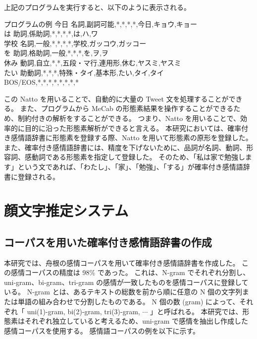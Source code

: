 \documentclass[11pt,a4j]{jsarticle}
\begin{document}
上記のプログラムを実行すると、以下のように表示される。

\begin{itembox}[l]{プログラムの例}
  今日  名詞,副詞可能,*,*,*,*,今日,キョウ,キョー \\
  は  助詞,係助詞,*,*,*,*,は,ハ,ワ\\ 
  学校  名詞,一般,*,*,*,*,学校,ガッコウ,ガッコー\\
  を  助詞,格助詞,一般,*,*,*,を,ヲ,ヲ\\
  休み  動詞,自立,*,*,五段・マ行,連用形,休む,ヤスミ,ヤスミ\\
  たい  助動詞,*,*,*,特殊・タイ,基本形,たい,タイ,タイ\\
 BOS/EOS,*,*,*,*,*,*,*,*\\
\end{itembox}

この Natto を用いることで、自動的に大量の Tweet 文を処理することができる。
また、プログラムから MeCab の形態素結果を操作することができるため、制約付きの解析をすることができる。
つまり、Natto を用いることで、効率的に目的に沿った形態素解析ができると言える。
本研究においては、確率付き感情語辞書に形態素を登録する際、Natto を用いて形態素の原形を登録した。
また、確率付き感情語辞書には、精度を下げないために、品詞が名詞、動詞、形容詞、感動詞である形態素を指定して登録した。
そのため、「私は家で勉強します」という文であれば、「わたし」、「家」、「勉強」、「する」が確率付き感情語辞書に登録される。


\section{顔文字推定システム}\label{sec:theorem}
  \subsection{コーパスを用いた確率付き感情語辞書の作成}\label{sec:tweetcorpus}
本研究では、舟根の感情コーパスを用いて確率付き感情語辞書を作成した。
この感情コーパスの精度は 98\% であった。
これは、N-gram でそれぞれ分割し、uni-gram、bi-gram、tri-gram の感情が一致したものを感情コーパスに登録している。
N-gram とは、あるテキストの総数を前から順に任意の N 個の文字列または単語の組み合わせで分割したものである。
N 個の数 (gram) によって、それぞれ「 uni(1)-gram, bi(2)-gram, tri(3)-gram, $\cdots$ 」と呼ばれる。
本研究では、形態素はそれぞれ独立していると考えるため、uni-gram で感情を抽出し作成した感情コーパスを使用する。
感情語コーパスの例を以下に示す。
\end{document}
